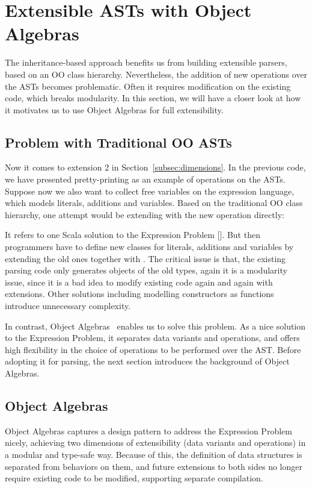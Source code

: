 \section{Extensible ASTs with Object Algebras}\label{sec:algebrasandparsing}

The inheritance-based approach benefits us from building extensible parsers, based on an OO class hierarchy.
Nevertheless, the addition of new operations over the ASTs becomes problematic. Often it requires modification on
the existing code, which breaks modularity. In this section, we will have a closer look at how it motivates us to
use Object Algebras for full extensibility.

\subsection{Problem with Traditional OO ASTs}\label{subsec:problemwithoutoa}

Now it comes to extension 2 in Section~\ref{subsec:dimensions}. In the previous code, we have presented pretty-printing as
an example of operations on the ASTs. Suppose now we also want to collect free variables on the expression language, which models
literals, additions and variables. Based on the traditional OO class hierarchy, one attempt would be extending  with the new
operation directly:

It refers to one Scala solution to the Expression Problem []. But then programmers have to define new classes for literals, additions and variables
by extending the old ones together with . The critical issue is that, the existing parsing code only generates objects of the old
types, again it is a modularity issue, since it is a bad idea to modify existing code again and again with extensions. Other solutions including modelling constructors as functions introduce unnecessary complexity.

In contrast, Object Algebras~\cite{Oliveira2012} enables us to solve this problem. As a nice solution to the Expression Problem, it separates data variants
and operations, and offers high flexibility in the choice of operations to be performed over the AST. Before adopting it for parsing, the next section introduces the background of Object Algebras.

\subsection{Object Algebras}\label{subsec:objectalgebras}
Object Algebras captures a design pattern to address the Expression Problem nicely,
achieving two dimensions of extensibility (data variants and operations) in a modular and type-safe way.
Because of this, the definition of data structures is separated from behaviors on them, and future extensions
to both sides no longer require existing code to be modified, supporting separate compilation.

